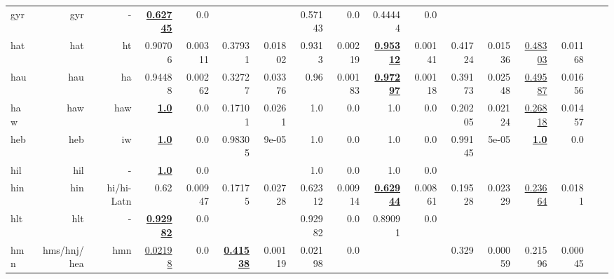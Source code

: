 \documentclass[11pt]{article}
\begin{document}
\begin{table*}[h]
{\begin{tabular}{lrrrrrrrrrrrrrrrr}
gyr         & gyr         & -         & \textbf{\underline{0.62745}}         & 0.0         &          &          & 0.57143         & 0.0         & 0.44444         & 0.0         &          &          &          &          \\
hat         & hat         & ht         & 0.90706         & 0.00311         & 0.37931         & 0.01802         & 0.9313         & 0.00219         & \textbf{\underline{0.95312}}         & 0.00141         & 0.41724         & 0.01536         & \underline{0.48303}         & 0.01168         \\
hau         & hau         & ha         & 0.94488         & 0.00262         & 0.32727         & 0.03376         & 0.96         & 0.00183         & \textbf{\underline{0.97297}}         & 0.00118         & 0.39173         & 0.02548         & \underline{0.49587}         & 0.01656         \\
haw         & haw         & haw         & \textbf{\underline{1.0}}         & 0.0         & 0.17101         & 0.0261         & 1.0         & 0.0         & 1.0         & 0.0         & 0.20205         & 0.02124         & \underline{0.26818}         & 0.01457         \\
heb         & heb         & iw         & \textbf{\underline{1.0}}         & 0.0         & 0.98305         & 9e-05         & 1.0         & 0.0         & 1.0         & 0.0         & 0.99145         & 5e-05         & \textbf{\underline{1.0}}         & 0.0         \\
hil         & hil         & -         & \textbf{\underline{1.0}}         & 0.0         &          &          & 1.0         & 0.0         & 1.0         & 0.0         &          &          &          &          \\
hin         & hin         & hi/hi-Latn         & 0.62         & 0.00947         & 0.17175         & 0.02728         & 0.62312         & 0.00914         & \textbf{\underline{0.62944}}         & 0.00861         & 0.19528         & 0.02329         & \underline{0.23664}         & 0.0181         \\
hlt         & hlt         & -         & \textbf{\underline{0.92982}}         & 0.0         &          &          & 0.92982         & 0.0         & 0.89091         & 0.0         &          &          &          &          \\
hmn         & hms/hnj/hea         & hmn         & \underline{0.02198}         & 0.0         & \textbf{\underline{0.41538}}         & 0.00119         & 0.02198         & 0.0         &          &          & 0.329         & 0.00059         & 0.21596         & 0.00045         \\

\end{tabular}}
\end{table*}
\end{document}

